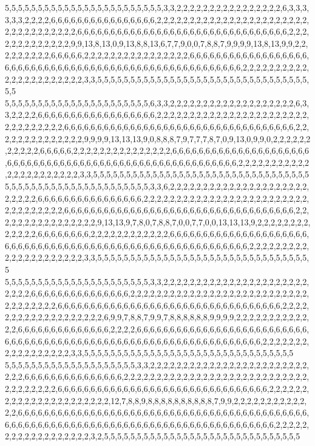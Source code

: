 5,5,5,5,5,5,5,5,5,5,5,5,5,5,5,5,5,5,5,5,5,5,5,5,3,3,2,2,2,2,2,2,2,2,2,2,2,2,2,2,2,2,6,3,3,3,3,3,3,2,2,2,2,6,6,6,6,6,6,6,6,6,6,6,6,6,6,6,6,2,2,2,2,2,2,2,2,2,2,2,2,2,2,2,2,2,2,2,2,2,2,2,2,2,2,2,2,2,2,2,2,2,2,6,6,6,6,6,6,6,6,6,6,6,6,6,6,6,6,6,6,6,6,6,6,6,6,6,6,6,6,6,6,6,6,2,2,2,2,2,2,2,2,2,2,2,2,2,9,9,13,8,13,0,9,13,8,8,13,6,7,7,9,0,0,7,8,8,7,9,9,9,9,13,8,13,9,9,2,2,2,2,2,2,2,2,2,6,6,6,6,6,2,2,2,2,2,2,2,2,2,2,2,2,2,2,2,2,6,6,6,6,6,6,6,6,6,6,6,6,6,6,6,6,6,6,6,6,6,6,6,6,6,6,6,6,6,6,6,6,6,6,6,6,6,6,6,6,6,6,6,6,6,6,6,6,6,6,6,6,6,6,2,2,2,2,2,2,2,2,2,2,2,2,2,2,2,2,2,2,2,2,2,2,3,3,5,5,5,5,5,5,5,5,5,5,5,5,5,5,5,5,5,5,5,5,5,5,5,5,5,5,5,5,5,5,5,5,5,5
5,5,5,5,5,5,5,5,5,5,5,5,5,5,5,5,5,5,5,5,5,5,6,3,3,2,2,2,2,2,2,2,2,2,2,2,2,2,2,2,2,2,2,2,6,3,3,2,2,2,2,6,6,6,6,6,6,6,6,6,6,6,6,6,6,6,6,6,6,2,2,2,2,2,2,2,2,2,2,2,2,2,2,2,2,2,2,2,2,2,2,2,2,2,2,2,2,2,2,2,2,6,6,6,6,6,6,6,6,6,6,6,6,6,6,6,6,6,6,6,6,6,6,6,6,6,6,6,6,6,6,6,6,6,6,6,2,2,2,2,2,2,2,2,2,2,2,2,2,2,9,9,9,9,13,13,13,9,0,8,8,8,7,9,7,7,7,8,7,0,9,13,0,9,9,0,2,2,2,2,2,2,2,2,2,2,2,6,6,6,6,6,2,2,2,2,2,2,2,2,2,2,2,2,2,2,2,6,6,6,6,6,6,6,6,6,6,6,6,6,6,6,6,6,6,6,6,6,6,6,6,6,6,6,6,6,6,6,6,6,6,6,6,6,6,6,6,6,6,6,6,6,6,6,6,6,6,6,6,6,6,6,6,2,2,2,2,2,2,2,2,2,2,2,2,2,2,2,2,2,2,2,2,2,2,3,3,5,5,5,5,5,5,5,5,5,5,5,5,5,5,5,5,5,5,5,5,5,5,5,5,5,5,5,5,5,5,5,5,5
5,5,5,5,5,5,5,5,5,5,5,5,5,5,5,5,5,5,5,5,5,5,3,3,6,2,2,2,2,2,2,2,2,2,2,2,2,2,2,2,2,2,2,2,2,2,2,2,2,2,2,6,6,6,6,6,6,6,6,6,6,6,6,6,6,6,6,2,2,2,2,2,2,2,2,2,2,2,2,2,2,2,2,2,2,2,2,2,2,2,2,2,2,2,2,2,2,2,2,2,2,6,6,6,6,6,6,6,6,6,6,6,6,6,6,6,6,6,6,6,6,6,6,6,6,6,6,6,6,6,6,6,6,6,6,6,2,2,2,2,2,2,2,2,2,2,2,2,2,2,2,2,9,13,13,9,7,8,0,7,8,8,7,0,0,7,7,0,0,13,13,13,9,2,2,2,2,2,2,2,2,2,2,2,2,2,6,6,6,6,6,6,6,6,2,2,2,2,2,2,2,2,2,2,2,2,6,6,6,6,6,6,6,6,6,6,6,6,6,6,6,6,6,6,6,6,6,6,6,6,6,6,6,6,6,6,6,6,6,6,6,6,6,6,6,6,6,6,6,6,6,6,6,6,6,6,6,6,6,6,6,6,6,6,2,2,2,2,2,2,2,2,2,2,2,2,2,2,2,2,2,2,2,2,2,3,3,5,5,5,5,5,5,5,5,5,5,5,5,5,5,5,5,5,5,5,5,5,5,5,5,5,5,5,5,5,5,5,5,5
5,5,5,5,5,5,5,5,5,5,5,5,5,5,5,5,5,5,5,5,5,5,3,3,2,2,2,2,2,2,2,2,2,2,2,2,2,2,2,2,2,2,2,2,2,2,2,2,2,2,6,6,6,6,6,6,6,6,6,6,6,6,6,6,6,2,2,2,2,2,2,2,2,2,2,2,2,2,2,2,2,2,2,2,2,2,2,2,2,2,2,2,2,2,2,2,2,2,2,2,6,6,6,6,6,6,6,6,6,6,6,6,6,6,6,6,6,6,6,6,6,6,6,6,6,6,6,6,6,6,6,6,6,6,2,2,2,2,2,2,2,2,2,2,2,2,2,2,2,2,2,2,2,6,9,9,7,8,8,7,9,9,7,8,8,8,8,8,8,9,9,9,9,2,2,2,2,2,2,2,2,2,2,2,2,2,6,6,6,6,6,6,6,6,6,6,6,6,6,6,2,2,2,2,6,6,6,6,6,6,6,6,6,6,6,6,6,6,6,6,6,6,6,6,6,6,6,6,6,6,6,6,6,6,6,6,6,6,6,6,6,6,6,6,6,6,6,6,6,6,6,6,6,6,6,6,6,6,6,6,6,6,6,6,6,6,6,6,6,2,2,2,2,2,2,2,2,2,2,2,2,2,2,2,2,2,3,3,5,5,5,5,5,5,5,5,5,5,5,5,5,5,5,5,5,5,5,5,5,5,5,5,5,5,5,5,5,5,5,5
5,5,5,5,5,5,5,5,5,5,5,5,5,5,5,5,5,5,5,5,3,3,2,2,2,2,2,2,2,2,2,2,2,2,2,2,2,2,2,2,2,2,2,2,2,2,2,2,2,6,6,6,6,6,6,6,6,6,6,6,6,6,6,6,2,2,2,2,2,2,2,2,2,2,2,2,2,2,2,2,2,2,2,2,2,2,2,2,2,2,2,2,2,2,2,2,2,2,2,2,6,6,6,6,6,6,6,6,6,6,6,6,6,6,6,6,6,6,6,6,6,6,6,6,6,6,6,6,6,6,6,6,2,2,2,2,2,2,2,2,2,2,2,2,2,2,2,2,2,2,2,2,2,2,12,7,8,8,9,8,8,8,8,8,8,8,8,8,8,7,9,9,2,2,2,2,2,2,2,2,2,2,2,2,2,6,6,6,6,6,6,6,6,6,6,6,6,6,6,6,6,6,6,6,6,6,6,6,6,6,6,6,6,6,6,6,6,6,6,6,6,6,6,6,6,6,6,6,6,6,6,6,6,6,6,6,6,6,6,6,6,6,6,6,6,6,6,6,6,6,6,6,6,6,6,6,6,6,6,6,6,6,6,6,6,6,6,6,6,6,2,2,2,2,2,2,2,2,2,2,2,2,2,2,2,2,2,2,3,2,5,5,5,5,5,5,5,5,5,5,5,5,5,5,5,5,5,5,5,5,5,5,5,5,5,5,5,5,5,5
